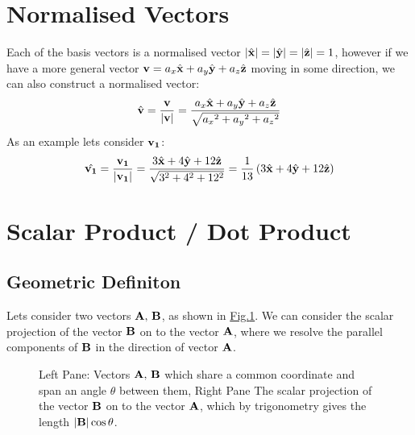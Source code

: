 \documentclass[letterpaper,10pt,english]{jupyterBook}
\begin{document}
\section{Normalised Vectors}
\label{\detokenize{VectorCalculus/vectoralgebra:normalised-vectors}}
\sphinxAtStartPar
Each of the basis vectors is a normalised vector \(|\hat{\bf x}| = |\hat{\bf y}| = |\hat{\bf z}| = 1\), however if we have a more general vector
\({\bf v} = a_x\hat{\bf x} + a_y\hat{\bf y} + a_z\hat{\bf z}\) moving in some direction, we can also construct a normalised vector:
\begin{equation*}
\begin{split}\hat{\bf v} = \frac{\bf v}{|\bf v|} = \frac{a_x\hat{\bf x} + a_y\hat{\bf y} + a_z\hat{\bf z}}{\sqrt{{a_x}^2 + {a_y}^2 + {a_z}^2}}\end{split}
\end{equation*}
\sphinxAtStartPar
As an example lets consider \(\bf v_1\):
\begin{equation*}
\begin{split}\hat{\bf v_1} = \frac{\bf v_1}{|\bf v_1|} = \frac{3\hat{\bf x} + 4\hat{\bf y} + 12\hat{\bf z}}{\sqrt{3^2 + 4^2 + 12^2}} = \frac{1}{13}\left(3\hat{\bf x} + 4\hat{\bf y} + 12\hat{\bf z}\right)\end{split}
\end{equation*}

\section{Scalar Product / Dot Product}
\label{\detokenize{VectorCalculus/vectoralgebra:scalar-product-dot-product}}

\subsection{Geometric Definiton}
\label{\detokenize{VectorCalculus/vectoralgebra:geometric-definiton}}
\sphinxAtStartPar
Lets consider two vectors \(\bf A,\, B\), as shown in \hyperref[\detokenize{VectorCalculus/vectoralgebra:scalarprojection}]{Fig.\@ \ref{\detokenize{VectorCalculus/vectoralgebra:scalarprojection}}}.  We can consider the scalar projection of the vector \(\bf B\) on to the vector \(\bf A\), where we resolve the
parallel components of \(\bf B\) in the direction of vector \(\bf A\).

\begin{figure}[htbp]
\centering
\capstart

\noindent{}
\caption{Left Pane: Vectors \(\bf A,\, B\) which share a common coordinate and span an angle \(\theta\) between them,
Right Pane The scalar projection of the vector \(\bf B\) on to the vector \(\bf A\), which by trigonometry gives the length \(|{\bf B}| \cos\theta\).}\label{\detokenize{VectorCalculus/vectoralgebra:scalarprojection}}\end{figure}
\end{document}
